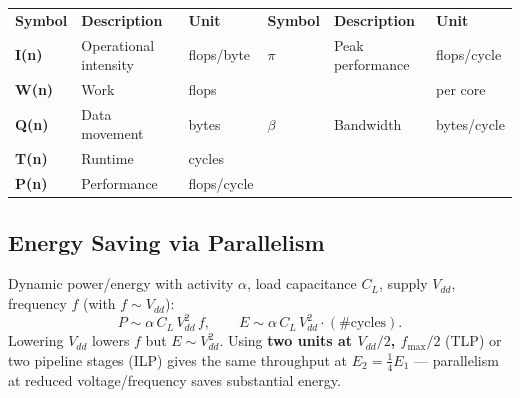 \begin{tabular}{llllll}
    \toprule
    \textbf{Symbol}     & \textbf{Description}  & \textbf{Unit} & \textbf{Symbol}     & \textbf{Description}  & \textbf{Unit}\\
    \textbf{I(n)}       & Operational intensity & flops/byte    & \textbf{$\pi$}      & Peak performance      & flops/cycle\\
    \textbf{W(n)}       & Work                  & flops         &                     &                       & per core\\
    \textbf{Q(n)}       & Data movement         & bytes         & \textbf{$\beta$}    & Bandwidth             & bytes/cycle\\
    \textbf{T(n)}       & Runtime               & cycles        &                     &                       & \\
    \textbf{P(n)}       & Performance           & flops/cycle   &                     &                       & \\
\end{tabular}

\subsection{Energy Saving via Parallelism}
Dynamic power/energy with activity $\alpha$, load capacitance $C_L$, supply $V_{dd}$, frequency $f$ (with $f\sim V_{dd}$):
\[ P \sim \alpha\,C_L\,V_{dd}^2\,f, \qquad E \sim \alpha\,C_L\,V_{dd}^2\cdot(\#\text{cycles}). \]
Lowering $V_{dd}$ lowers $f$ but $E\sim V_{dd}^2$. Using \textbf{two units at $V_{dd}/2$, $f_\text{max}/2$} (TLP) or two pipeline stages (ILP) gives the same throughput at $E_2=\tfrac14 E_1$ --- parallelism at reduced voltage/frequency saves substantial energy.
